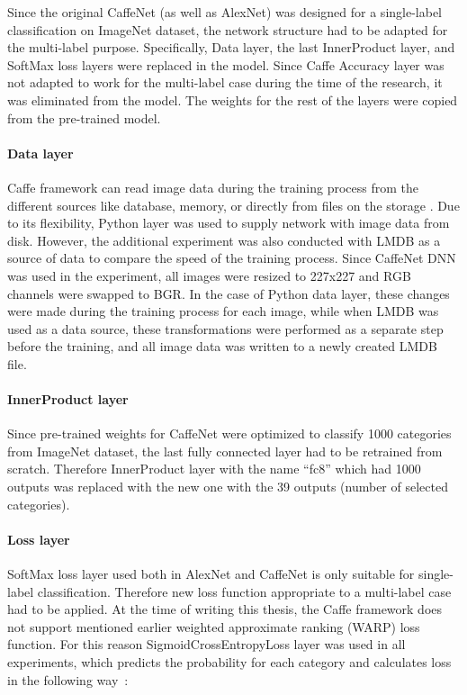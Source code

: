     Since the original CaffeNet (as well as  AlexNet) was designed for a single-label classification on ImageNet dataset, the network structure had to be adapted for the multi-label purpose. Specifically, Data layer, the last InnerProduct layer, and SoftMax loss layers were replaced in the model. Since Caffe Accuracy layer was not adapted to work for the multi-label case during the time of the research, it was eliminated from the model. The weights for the rest of the layers were copied from the pre-trained model.
    
    \paragraph{Data layer}
    Caffe framework can read image data during the training process from the different sources like database, memory, or directly from files on the storage \cite{CaffeLayerCatalogue}. Due to its flexibility, Python layer was used to supply network with image data from disk. However, the additional experiment was also conducted with LMDB \cite{lmdb} as a source of data to compare the speed of the training process. Since CaffeNet DNN was used in the experiment, all images were resized to 227x227 and RGB channels were swapped to BGR. In the case of Python data layer, these changes were made during the training process for each image, while when LMDB was used as a data source, these transformations were performed as a separate step before the training, and all image data was written to a newly created LMDB file.
    
    \paragraph{InnerProduct layer}
    Since pre-trained weights for CaffeNet were optimized to classify 1000 categories from ImageNet dataset, the last fully connected layer had to be retrained from scratch. Therefore InnerProduct layer with the name ``fc8'' which had 1000 outputs was replaced with the new one with the 39 outputs (number of selected categories).
    
    \paragraph{Loss layer}
    SoftMax loss layer used both in AlexNet and CaffeNet is only suitable for single-label classification. Therefore new loss function appropriate to a multi-label case had to be applied. At the time of writing this thesis, the Caffe framework does not support mentioned earlier weighted approximate ranking (WARP) loss function. For this reason SigmoidCrossEntropyLoss layer was used in all experiments, which predicts the probability for each category and calculates loss in the following way~\cite{CaffeSigmoidCrossEntropyLoss}:
    
